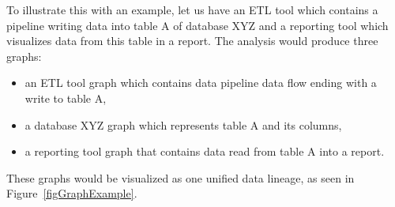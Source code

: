 \par
To illustrate this with an example, let us have an ETL tool which contains a pipeline writing data into table A of database XYZ and a reporting tool which visualizes data from this table in a report. The analysis would produce three graphs:
\begin{itemize}
    \item an ETL tool graph which contains data pipeline data flow ending with a write to table A,
    \item a database XYZ graph which represents table A and its columns,
    \item a reporting tool graph that contains data read from table A into a report. 
\end{itemize}
These graphs would be visualized as one unified data lineage, as seen in Figure~\ref{figGraphExample}.

